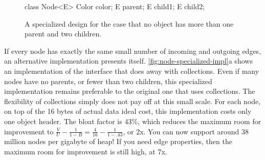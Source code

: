 \begin{figure}
\centering
\begin{minipage}[b]{0.24\textwidth}
\begin{framedlisting}
class Node<E> {
   Color color;
   E parent;
   E child1;
   E child2;
}
\end{framedlisting}
\end{minipage}
\caption{A specialized design for the case that
no object has more than one parent and two children.}
\label{fig:node-specialized-impl}
\end{figure} 
If every node has exactly the same small number of incoming and outgoing edges,
an alternative implementation presents itself.
\autoref{fig:node-specialized-impl}a shows an implementation of the 
interface that does away with collections.
Even if many nodes have no parents, or fewer than two children, this
specialized implementation remains preferable to the original one that uses
collections. The flexibility of collections simply does not pay off at this
small scale.
For each node, on top of the 16 bytes of actual data ideal cost, this
implementation costs only one object header. The bloat factor is 43\%, which
reduces the maximum room for improvement to $\frac{V}{U}-\frac{1}{1-B}=
\frac{4}{16}-\frac{1}{1-.43}$, or 2x. You can now support around 38 million
nodes per gigabyte of heap! If you need edge properties, then the maximum room
for improvement is still high, at 7x.



